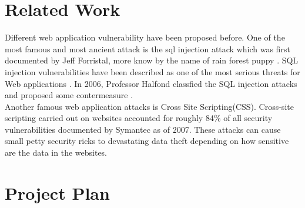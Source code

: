 \documentclass[12pt, a4paper]{article}
\begin{document}
\section{Related Work}
Different web application vulnerability have been proposed before. One of the most famous and most ancient attack is the sql injection attack which was first documented by Jeff Forristal, more know by the name of rain
forest puppy \cite{Jeff}.  SQL injection vulnerabilities have been described as one of the most serious threats for Web applications \cite{Aucsmith} \cite{TO}. In 2006, Professor Halfond classfied the SQL injection attacks and proposed some contermeasure \cite{halfond06mar}.\\

Another famous web application attacks is Cross Site Scripting(CSS). Cross-site scripting carried out on websites accounted for roughly 84\% of all security vulnerabilities documented by Symantec as of 2007\cite{symantec}. These attacks can cause small petty security ricks to devastating data theft depending on how sensitive are the data in the websites.

\section{Project Plan}



\end{document}

